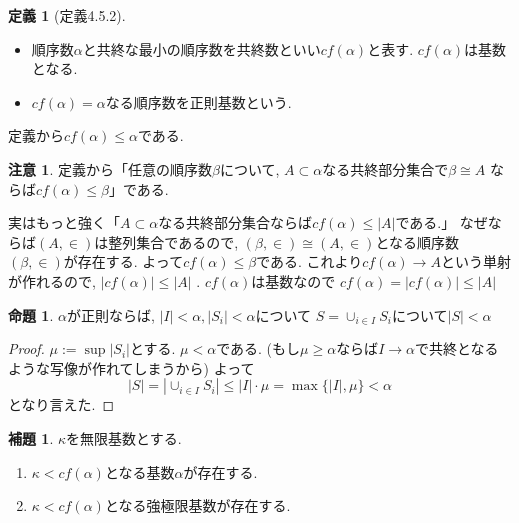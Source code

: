 \documentclass[dvipdfmx,a4paper,11pt]{article}
\theoremstyle{definition}
\newtheorem{lem}[thm]{補題}
\newtheorem{prop}[thm]{命題}
\newtheorem{dfn}[thm]{定義}
\newtheorem{rem}[thm]{注意}
\begin{document}
 \begin{tcolorbox}
 [colback = white, colframe = green!35!black, fonttitle = \bfseries,breakable = true]
\begin{dfn}[定義4.5.2]
\begin{itemize}
\item 順序数$\alpha$と共終な最小の順序数を共終数といい$cf(\alpha)$と表す. 
$cf(\alpha)$は基数となる.  
\item $cf(\alpha) = \alpha$なる順序数を正則基数という. 
\end{itemize}
\end{dfn}
\end{tcolorbox}
定義から$cf(\alpha)\le \alpha$である. 

\begin{rem}
定義から「任意の順序数$\beta$について, $A \subset \alpha$なる共終部分集合で$\beta \cong A$
ならば$cf(\alpha) \le \beta$」である. 

実はもっと強く「$A \subset \alpha$なる共終部分集合ならば$cf(\alpha) \le |A|$である.」
なぜならば$(A, \in)$は整列集合であるので, $(\beta, \in) \cong (A, \in)$となる順序数$(\beta, \in)$が存在する.
よって$cf(\alpha) \le \beta$である.
これより$cf(\alpha)\to A$という単射が作れるので, $|cf(\alpha)| \le |A|$ . $cf(\alpha)$は基数なので
$cf(\alpha) = |cf(\alpha)| \le |A|$
\end{rem}


 \begin{tcolorbox}
 [colback = white, colframe = green!35!black, fonttitle = \bfseries,breakable = true]
\begin{prop}
\label{prop-regular-cardinal}
$\alpha$が正則ならば, $| I | <  \alpha, |S_i| < \alpha$について
$ S = \cup_{i \in I}S_i$について$|S| < \alpha$
\end{prop}
\end{tcolorbox}
\begin{proof}
$\mu := \sup |S_{i}|$とする.
$\mu < \alpha$である.
(もし$\mu \ge \alpha$ならば$I \to \alpha$で共終となるような写像が作れてしまうから)
よって
$$
|S| =
 |\cup_{i \in I}S_i |
 \le 
 | I | \cdot {\mu}
= \max \{|I|, \mu\}
< \alpha
$$
となり言えた. 
\end{proof}




 \begin{tcolorbox}
 [colback = white, colframe = green!35!black, fonttitle = \bfseries,breakable = true]
\begin{lem}\cite[000E 3.7 Cofinality]{Sta}
\label{lem-cofinal}
$\kappa$を無限基数とする.
\begin{enumerate}
\item $\kappa < cf(\alpha)$となる基数$\alpha$が存在する.
\item $\kappa < cf(\alpha)$となる強極限基数が存在する.
\end{enumerate}
\end{lem}
 \end{tcolorbox}
 
\end{document}
